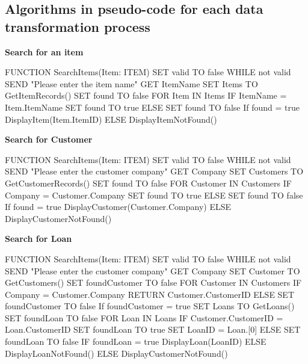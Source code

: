 \subsection{Algorithms in pseudo-code for each data transformation process}

\textbf{Search for an item}
\begin{sql}
    FUNCTION SearchItems(Item: ITEM)
        SET valid TO false
        WHILE not valid
            SEND "Please enter the item name"
            GET ItemName
        SET Items TO GetItemRecords()
        SET found TO false
        FOR Item IN Items
            IF ItemName = Item.ItemName
                SET found TO true
            ELSE
                SET found TO false
        If found = true
            DisplayItem(Item.ItemID)
        ELSE
            DisplayItemNotFound()
\end{sql}

\textbf{Search for Customer}
\begin{sql}
    FUNCTION SearchItems(Item: ITEM)
        SET valid TO false
        WHILE not valid
            SEND "Please enter the customer company"
            GET Company
        SET Customers TO GetCustomerRecords()
        SET found TO false
        FOR Customer IN Customers
            IF Company = Customer.Company
                SET found TO true
            ELSE
                SET found TO false
        If found = true
            DisplayCustomer(Customer.Company)
        ELSE
            DisplayCustomerNotFound()
\end{sql}

\newpage

\textbf{Search for Loan}
\begin{sql}
    FUNCTION SearchItems(Item: ITEM)
        SET valid TO false
        WHILE not valid
            SEND "Please enter the customer company"
            GET Company
        SET Customer TO GetCustomers()
        SET foundCustomer TO false
        FOR Customer IN Customers
            IF Company = Customer.Company
                RETURN Customer.CustomerID
            ELSE
                SET foundCustomer TO false
        If foundCustomer = true
            SET Loans TO GetLoans()
            SET foundLoan TO false
            FOR Loan IN Loans
                IF Customer.CustomerID = Loan.CustomerID
                    SET foundLoan TO true
                    SET LoanID = Loan.[0]
                ELSE
                    SET foundLoan TO false
            IF foundLoan = true
                DisplayLoan(LoanID)
            ELSE
                DisplayLoanNotFound()
        ELSE
            DisplayCustomerNotFound()
        
\end{sql}

